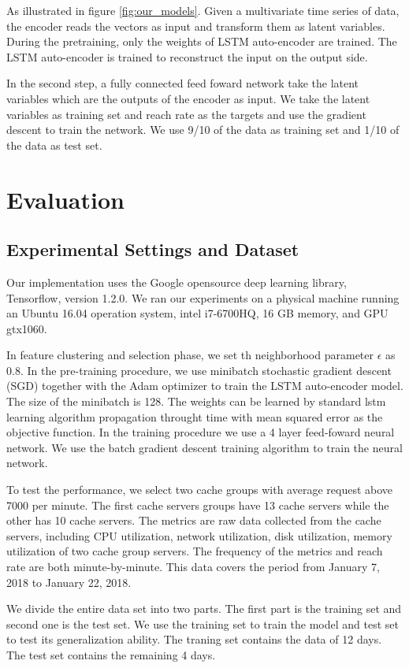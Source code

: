 \documentclass[5p]{elsarticle}
\newcommand{\dabiaolv}{reach rate }
\begin{document}
As illustrated in figure \ref{fig:our_models}. Given a multivariate time series of data, the encoder reads the vectors as input and transform them as latent variables. During the pretraining, only the weights of LSTM auto-encoder are trained. The LSTM auto-encoder is trained to reconstruct the input on the output side. 

In the second step, a fully connected feed foward network take the latent variables which are the outputs of the encoder as input. We take the latent variables as training set and \dabiaolv as the targets and use the gradient descent to train the network. We use 9/10 of the data as training set and 1/10 of the data as test set.

\section{Evaluation}
\subsection{Experimental Settings and Dataset}
Our implementation uses the Google opensource deep learning library, Tensorflow\cite{TensorFlow}, version 1.2.0. We ran our experiments on a physical machine running an Ubuntu 16.04 operation system, intel i7-6700HQ, 16 GB memory, and GPU gtx1060.

In feature clustering and selection phase, we set th neighborhood parameter $\epsilon$ as 0.8. In the pre-training procedure, we use minibatch stochastic gradient descent (SGD) together with the Adam optimizer to train the LSTM auto-encoder model. The size of the minibatch is 128. The weights can be learned by standard lstm learning algorithm propagation throught time with mean squared error as the objective function. In the training procedure we use a 4 layer feed-foward neural network. We use the batch gradient descent training algorithm to train the neural network.

To test the performance, we select two cache groups with average request above 7000 per minute. The first cache servers groups have 13 cache servers while the other has 10 cache servers. The metrics are raw data collected from the cache servers, including CPU utilization, network utilization, disk utilization, memory utilization of two cache group servers. The frequency of the metrics and \dabiaolv are both minute-by-minute. This data covers the period from January 7, 2018 to January 22, 2018.

We divide the entire data set into two parts. The first part is the training set and second one is the test set. We use the training set to train the model and test set to test its generalization ability. The traning set contains the data of 12 days. The test set contains the remaining 4 days.
\end{document}
